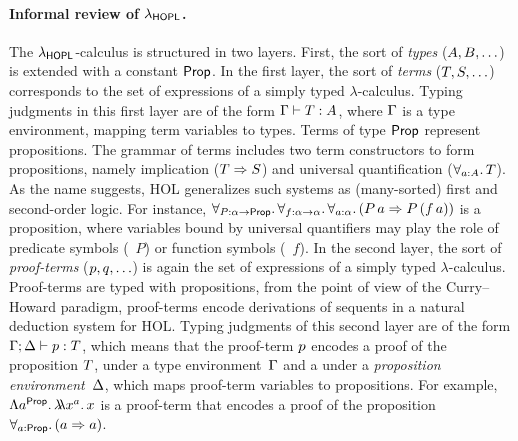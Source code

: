 \paragraph{Informal review of ${\lambda}_{\mathsf{HOPL}}$.}
The ${\lambda}_{\mathsf{HOPL}}$-calculus is structured in two layers.
First, the sort of \emph{types} ($A,B,\hdots$)
is extended with a constant $\mathsf{Prop}$.
In the first layer, the sort of \emph{terms} ($T,S,\hdots$)
corresponds to the set of expressions of a simply typed $\lambda$-calculus.
Typing judgments in this first layer are of the form $\Gamma\vdash T:A$,
where $\Gamma$ is a type environment, mapping term variables to types.
Terms of type $\mathsf{Prop}$ represent propositions.
The grammar of terms includes two term constructors
to form propositions,
namely implication ($T\Rightarrow S$)
and universal quantification ($\forall_{a:A}.\,T$).
As the name suggests, HOL generalizes such systems as
(many-sorted) first and second-order logic.
For instance,
$\forall_{P:\alpha\to\mathsf{Prop}}.\,\forall_{f:\alpha\to\alpha}.\,\forall_{a:\alpha}.\,(P\,a \Rightarrow P\,(f\,a))$
is a proposition, where variables bound by universal quantifiers may
play the role of predicate symbols (\eg~$P$) or function symbols (\eg~$f$).
In the second layer,
the sort of \emph{proof-terms} ($p,q,\hdots$)
is again the set of expressions of a simply typed $\lambda$-calculus.
Proof-terms are typed with propositions,
\ie from the point of view of the Curry--Howard paradigm,
proof-terms encode derivations of sequents
in a natural deduction system for HOL.
Typing judgments of this second layer are of the form
$\Gamma;\Delta\vdash p:T$,
which means that the proof-term $p$
encodes a proof of the proposition $T$,
under a type environment~$\Gamma$
and a under a \emph{proposition environment}~$\Delta$,
which maps proof-term variables to propositions.
For example, $\Lambda{a^{\mathsf{Prop}}}.\,\lambda\!\!\lambda{x^{a}}.\,x$
is a proof-term that encodes a proof of the proposition
$\forall_{a:\mathsf{Prop}}.\,(a\Rightarrow a)$.

